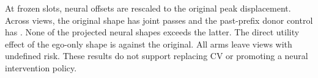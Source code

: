 At \MovingEqEdits{} frozen slots, neural offsets are rescaled to
the original peak displacement. Across \MovingEqViews{} views,
the original shape has \MovingEqAnchorPass{} joint passes and the
past-prefix donor control has \MovingEqPrefixPass{}. None of the
projected neural shapes exceeds the latter. The direct utility effect
of the ego-only shape is \MovingEqEgoMatched{} against the original.
All arms leave \MovingEqUndefined{} views with undefined risk.
These results do not support replacing CV or promoting a
neural intervention policy.
